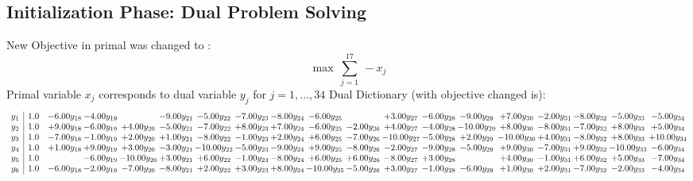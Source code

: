 \documentclass[9pt]{article}
\begin{document}
\subsection{Initialization Phase: Dual Problem Solving}
New Objective in primal was changed to : \[ \max\ \sum_{j=1}^{17}\ - x_j \] 
Primal variable $x_j$ corresponds to dual variable $y_j$ for $j = 1,\ldots,34$
Dual Dictionary (with objective changed is): 
\[\begin{array}{c| c c@{\hskip 2pt} c@{\hskip 2pt} c@{\hskip 2pt} c@{\hskip 2pt} c@{\hskip 2pt} c@{\hskip 2pt} c@{\hskip 2pt} c@{\hskip 2pt} c@{\hskip 2pt} c@{\hskip 2pt} c@{\hskip 2pt} c@{\hskip 2pt} c@{\hskip 2pt} c@{\hskip 2pt} c@{\hskip 2pt} c@{\hskip 2pt} c@{\hskip 2pt} }
 y_{1}   &  1.0 & -6.00 y_{18} & -4.00 y_{19} &   & -9.00 y_{21} & -5.00 y_{22} & -7.00 y_{23} & -8.00 y_{24} & -6.00 y_{25} &   & +  3.00 y_{27} & -6.00 y_{28} & -9.00 y_{29} & +  7.00 y_{30} & -2.00 y_{31} & -8.00 y_{32} & -5.00 y_{33} & -5.00 y_{34}\\
 y_{2}   &  1.0 & +  9.00 y_{18} & -6.00 y_{19} & +  4.00 y_{20} & -5.00 y_{21} & -7.00 y_{22} & +  8.00 y_{23} & +  7.00 y_{24} & -6.00 y_{25} & -2.00 y_{26} & +  4.00 y_{27} & -4.00 y_{28} & -10.00 y_{29} & +  8.00 y_{30} & -8.00 y_{31} & -7.00 y_{32} & +  8.00 y_{33} & +  5.00 y_{34}\\
 y_{3}   &  1.0 & -7.00 y_{18} & -1.00 y_{19} & +  2.00 y_{20} & +  1.00 y_{21} & -8.00 y_{22} & -1.00 y_{23} & +  2.00 y_{24} & +  6.00 y_{25} & -7.00 y_{26} & -10.00 y_{27} & -5.00 y_{28} & +  2.00 y_{29} & -10.00 y_{30} & +  4.00 y_{31} & -8.00 y_{32} & +  8.00 y_{33} & + 10.00 y_{34}\\
 y_{4}   &  1.0 & +  1.00 y_{18} & +  9.00 y_{19} & +  3.00 y_{20} & -3.00 y_{21} & -10.00 y_{22} & -5.00 y_{23} & -9.00 y_{24} & +  9.00 y_{25} & -8.00 y_{26} & -2.00 y_{27} & -9.00 y_{28} & -5.00 y_{29} & +  9.00 y_{30} & -7.00 y_{31} & +  9.00 y_{32} & -10.00 y_{33} & -6.00 y_{34}\\
 y_{5}   &  1.0  &   & -6.00 y_{19} & -10.00 y_{20} & +  3.00 y_{21} & +  6.00 y_{22} & -1.00 y_{23} & -8.00 y_{24} & +  6.00 y_{25} & +  6.00 y_{26} & -8.00 y_{27} & +  3.00 y_{28} &   & +  4.00 y_{30} & -1.00 y_{31} & +  6.00 y_{32} & +  5.00 y_{33} & -7.00 y_{34}\\
 y_{6}   &  1.0 & -6.00 y_{18} & -2.00 y_{19} & -7.00 y_{20} & -8.00 y_{21} & +  2.00 y_{22} & +  3.00 y_{23} & +  8.00 y_{24} & -10.00 y_{25} & -5.00 y_{26} & +  3.00 y_{27} & -1.00 y_{28} & -6.00 y_{29} & +  1.00 y_{30} & +  2.00 y_{31} & -7.00 y_{32} & -2.00 y_{33} & -4.00 y_{34}\\

\end{array}\]
\end{document}

